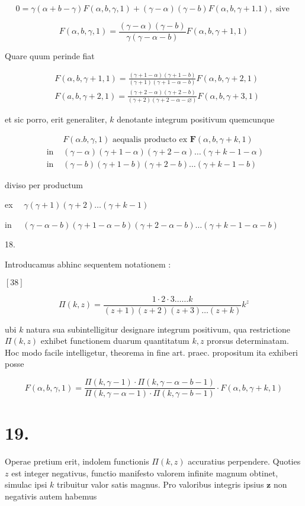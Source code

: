\documentclass[10pt]{article}
\begin{document}
\[
0=\gamma(\alpha+b-\gamma) F(\alpha, b, \gamma, 1)+(\gamma-\alpha)(\gamma-b) F(\alpha, b, \gamma+1.1), \text { sive }
\]

\[
F(\alpha, b, \gamma, 1)=\frac{(\gamma-\alpha)(\gamma-b)}{\gamma(\gamma-\alpha-b)} F(\alpha, b, \gamma+1,1)
\]

Quare quum perinde fiat

\[
\begin{aligned}
& F(\alpha, b, \gamma+1,1)=\frac{(\gamma+1-\alpha)(\gamma+1-b)}{(\gamma+1)(\gamma+1-\alpha-b)} F(\alpha, b, \gamma+2,1) \\
& F(a, b, \gamma+2,1)=\frac{(\gamma+2-\alpha)(\gamma+2-b)}{(\gamma+2)(\gamma+2-\alpha-\varnothing)} F(\alpha, b, \gamma+3,1)
\end{aligned}
\]

et sic porro, erit generaliter, \(k\) denotante integrum positivum quemcunque

\[
\begin{aligned}
& F(\alpha . b, \gamma, 1) \text { aequalis producto ex } \boldsymbol{F}(\alpha, b, \gamma+k, 1) \\
\text { in } & (\gamma-\alpha)(\gamma+1-\alpha)(\gamma+2-\alpha) \ldots(\gamma+k-1-\alpha) \\
\text { in } & (\gamma-b)(\gamma+1-b)(\gamma+2-b) \ldots(\gamma+k-1-b)
\end{aligned}
\]

diviso per productum

ex \(\quad \gamma(\gamma+1)(\gamma+2) \ldots(\gamma+k-1)\)

in \(\quad(\gamma-\alpha-b)(\gamma+1-\alpha-b)(\gamma+2-\alpha-b) \ldots(\gamma+k-1-\alpha-b)\)

18.

Introducamus abhinc sequentem notationem :

\([38]\)

\[
\Pi(k, z)=\frac{1 \cdot 2 \cdot 3 \ldots \ldots k}{(z+1)(z+2)(z+3) \ldots(z+k)} k^{z}
\]

ubi \(k\) natura sua subintelligitur designare integrum positivum, qua restrictione \(\Pi(k, z)\) exhibet functionem duarum quantitatum \(k, z\) prorsus determinatam. Hoc modo facile intelligetur, theorema in fine art. praec. propositum ita exhiberi posse

\[
F(\alpha, b, \gamma, 1)=\frac{\Pi(k, \gamma-1) \cdot \Pi(k, \gamma-\alpha-b-1)}{\Pi(k, \gamma-\alpha-1) \cdot \Pi(k, \gamma-b-1)} \cdot F(\alpha, b, \gamma+k, 1)
\]

\section*{19.}
Operae pretium erit, indolem functionis \(\Pi(k, z)\) accuratius perpendere. Quoties \(z\) est integer negativus, functio manifesto valorem infinite magnum obtinet, simulac ipsi \(k\) tribuitur valor satis magnus. Pro valoribus integris ipsius \(\boldsymbol{z}\) non negativis autem habemus
\end{document}

